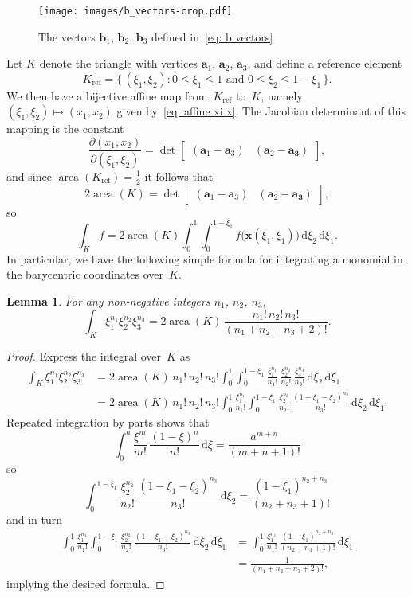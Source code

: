 \documentclass[a4paper,12pt]{article}
\newcommand{\bs}[1]{\boldsymbol{#1}}
\newcommand{\Kref}{K_{\mathrm{ref}}}
\newcommand{\area}{\operatorname{area}}
\newcommand{\ud}{\mathrm{d}}
\newtheorem{lemma}[theorem]{Lemma}
\begin{document}
\begin{figure}
\caption{The vectors $\bs{b}_1$, $\bs{b}_2$, $\bs{b}_3$ defined
in~\eqref{eq: b vectors}}\label{fig: b vectors}
\begin{center}
\texttt{[image: images/b\_vectors-crop.pdf]}
\end{center}
\end{figure}

Let $K$ denote the triangle with vertices $\bs{a}_1$, $\bs{a}_2$, $\bs{a}_3$,
and define a reference element
\[
\Kref=\{\,(\xi_1,\xi_2):\text{$0\le\xi_1\le1$ and $0\le\xi_2\le1-\xi_1$}\,\}.
\]
We then have a bijective affine map from~$\Kref$ to~$K$, namely
$(\xi_1,\xi_2)\mapsto(x_1,x_2)$ given by~\eqref{eq: affine xi x}.  The Jacobian
determinant of this mapping is the constant
\[
\frac{\partial(x_1,x_2)}{\partial(\xi_1,\xi_2)}
=\det\begin{bmatrix}(\bs{a}_1-\bs{a}_3)&(\bs{a}_2-\bs{a_3})\end{bmatrix},
\]
and since $\area(\Kref)=\tfrac12$ it follows that
\[
2\area(K)=\det\begin{bmatrix}
    (\bs{a}_1-\bs{a}_3)&(\bs{a}_2-\bs{a_3})\end{bmatrix},
\]
so
\[
\int_Kf=2\area(K)\int_0^1\int_0^{1-\xi_1}f\bigl(\bs{x}(\xi_1,\xi_1)\bigr)
    \,\ud\xi_2\,\ud\xi_1.
\]
In particular, we have the following simple formula for integrating a monomial
in the barycentric coordinates over~$K$.

\begin{lemma}\label{lem: integral monomial}
For any non-negative integers $n_1$, $n_2$, $n_3$,
\[
\int_K\xi_1^{n_1}\xi_2^{n_2}\xi_3^{n_3}
    =2\area(K)\,\frac{n_1!\,n_2!\,n_3!}{(n_1+n_2+n_3+2)!}.
\]
\end{lemma}
\begin{proof}
Express the integral over~$K$ as
\begin{align*}
\int_K\xi_1^{n_1}\xi_2^{n_2}\xi_3^{n_3}&=2\area(K)\,n_1!\,n_2!\,n_3!
    \int_0^1\int_0^{1-\xi_1}\frac{\xi_1^{n_1}}{n_1!}\,\frac{\xi_2^{n_2}}{n_2!}\,
        \frac{\xi_3^{n_3}}{n_3!}\,\ud\xi_2\,\ud\xi_1\\
    &=2\area(K)\,n_1!\,n_2!\,n_3!
    \int_0^1\frac{\xi_1^{n_1}}{n_1!}\int_0^{1-\xi_1}
    \frac{\xi_2^{n_2}}{n_2!}\,
    \frac{(1-\xi_1-\xi_2)^{n_3}}{n_3!}\,\ud\xi_2\,\ud\xi_1.
\end{align*}
Repeated integration by parts shows that
\[
\int_0^a\frac{\xi^m}{m!}\,\frac{(1-\xi)^n}{n!}\,\ud\xi
    =\frac{a^{m+n}}{(m+n+1)!}
\]
so
\[
\int_0^{1-\xi_1}\frac{\xi_2^{n_2}}{n_2!}\,
    \frac{(1-\xi_1-\xi_2)^{n_3}}{n_3!}\,\ud\xi_2
    =\frac{(1-\xi_1)^{n_2+n_3}}{(n_2+n_3+1)!}
\]
and in turn
\begin{align*}
\int_0^1\frac{\xi_1^{n_1}}{n_1!}\int_0^{1-\xi_1}
    \frac{\xi_2^{n_2}}{n_2!}\,
    \frac{(1-\xi_1-\xi_2)^{n_3}}{n_3!}\,\ud\xi_2\,\ud\xi_1
    &=\int_0^1\frac{\xi_1^{n_1}}{n_1!}\,
    \frac{(1-\xi_1)^{n_2+n_3}}{(n_2+n_3+1)!}\,\ud\xi_1\\
    &=\frac{1}{(n_1+n_2+n_3+2)!},
\end{align*}
implying the desired formula.
\end{proof}
\end{document}
